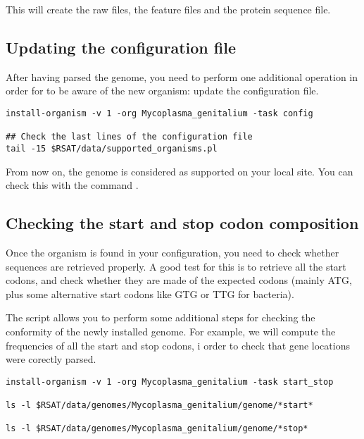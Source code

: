 This will create the raw files, the feature files and the protein sequence file.

\subsection{Updating the configuration file}

After having parsed the genome, you need to perform one additional
operation in order for \RSAT to be aware of the new organism: update
the configuration file.

\begin{footnotesize}
\begin{verbatim}
install-organism -v 1 -org Mycoplasma_genitalium -task config

## Check the last lines of the configuration file
tail -15 $RSAT/data/supported_organisms.pl
\end{verbatim}
\end{footnotesize}

From now on, the genome is considered as supported on your local \RSAT
site. You can check this with the command . 

\subsection{Checking the start and stop codon composition}

Once the organism is found in your configuration, you need to check
whether sequences are retrieved properly. A good test for this is to
retrieve all the start codons, and check whether they are made of the
expected codons (mainly ATG, plus some alternative start codons like
GTG or TTG for bacteria).

The script  allows you to perform some
additional steps for checking the conformity of the newly installed
genome. For example, we will compute the frequencies of all the start
and stop codons, i order to check that gene locations were corectly
parsed.

\begin{footnotesize}
\begin{verbatim}
install-organism -v 1 -org Mycoplasma_genitalium -task start_stop

ls -l $RSAT/data/genomes/Mycoplasma_genitalium/genome/*start*

ls -l $RSAT/data/genomes/Mycoplasma_genitalium/genome/*stop*
\end{verbatim}
\end{footnotesize}


